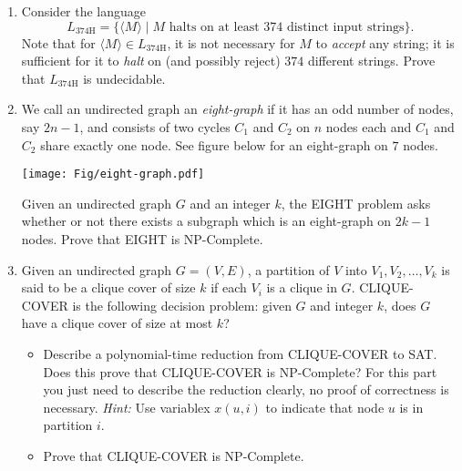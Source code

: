 \documentclass[11pt]{article}
\begin{document}
\vspace{1cm}

\begin{enumerate}



\item Consider the language $$L_{\text{374H}} = \{ \langle M\rangle
      \mid M \text{~halts on at least 374 distinct input strings}\}.$$ Note that
      for $\langle M\rangle \in L_{\text{374H}}$, it is not necessary
      for $M$ to {\em accept} any string; it is sufficient for it to
      {\em halt} on (and possibly reject) $374$ different strings. Prove that
      $L_{\text{374H}}$ is undecidable.



    \item We call an undirected graph an \emph{eight-graph} if it has
      an odd number of nodes, say $2n-1$, and consists of two cycles
      $C_1$ and $C_2$ on $n$ nodes each and $C_1$ and $C_2$ share
      exactly one node. See figure below for an eight-graph on $7$
      nodes.
  \begin{center}
    \texttt{[image: Fig/eight-graph.pdf]}
  \end{center}

  Given an undirected graph $G$ and an integer $k$, the EIGHT
  problem asks whether or not there exists a subgraph which is an eight-graph
  on $2k-1$ nodes. Prove that EIGHT is NP-Complete.

\item Given an undirected graph $G=(V,E)$, a partition of $V$
  into $V_1,V_2,\ldots,V_k$ is said to be a clique cover of size $k$
  if each $V_i$ is a clique in $G$. CLIQUE-COVER is the following
  decision problem: given $G$ and integer $k$, does $G$ have a clique
  cover of size at most $k$?
  \begin{itemize}
  \item Describe a polynomial-time reduction from CLIQUE-COVER to
    SAT. Does this prove that CLIQUE-COVER is NP-Complete? For this
    part you just need to describe the reduction clearly, no proof of
    correctness is necessary. {\em Hint:} Use variablex $x(u,i)$ to
    indicate that node $u$ is in partition $i$.
  \item Prove that CLIQUE-COVER is NP-Complete.
  \end{itemize}


\end{enumerate}
\end{document}
